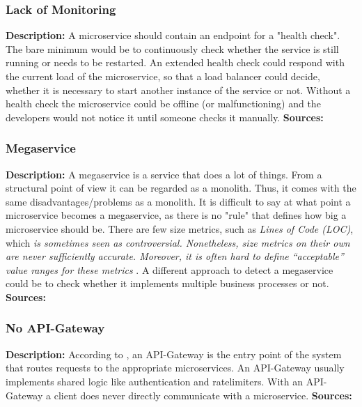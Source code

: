 \documentclass{article}
\begin{document}
\subsubsection{Lack of Monitoring}
\noindent\textbf{Description:} A microservice should contain an endpoint for a "health check". The bare minimum would be to continuously check whether the service is still running or needs to be restarted. An extended health check could respond with the current load of the microservice, so that a load balancer could decide, whether it is necessary to start another instance of the service or not. Without a health check the microservice could be offline (or malfunctioning) and the developers would not notice it until someone checks it manually. \newline
\noindent\textbf{Sources:} \cite{
    taibi_microservices_2020}
    
\subsubsection{Megaservice}
\noindent\textbf{Description:} A megaservice is a service that does a lot of things. From a structural point of view it can be regarded as a monolith. Thus, it comes with the same disadvantages/problems as a monolith. It is difficult to say at what point a microservice becomes a megaservice, as there is no "rule" that defines how big a microservice should be.
There are few size metrics, such as \textit{Lines of Code (LOC)}, which \textit{is sometimes seen as controversial. Nonetheless, size metrics on their own are never sufficiently accurate. Moreover, it is often hard to define “acceptable” value ranges for these metrics} \cite{bogner_automatically_2017}.
A different approach to detect a megaservice could be to check whether it implements multiple business processes or not. \newline 
\noindent\textbf{Sources:} \cite{
    taibi_microservices_2020,
    bogner_towards_2019}
    
\subsubsection{No API-Gateway}
\noindent\textbf{Description:} According to \cite{taibi_architectural_2018}, an API-Gateway is the entry point of the system that routes requests to the appropriate microservices. An API-Gateway usually implements shared logic like authentication and ratelimiters. With an API-Gateway a client does never directly communicate with a microservice. \newline
\noindent\textbf{Sources:} \cite{
    taibi_definition_2018,
    taibi_microservices_2020,
    neri_design_2019}
    
\end{document}
